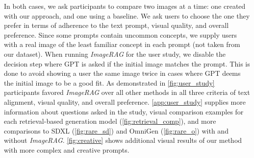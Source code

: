 In both cases, we ask participants to compare two images at a time: one created with our approach, and one using a baseline. We ask users to choose the one they prefer in terms of adherence to the text prompt,
visual quality, and overall preference. Since some prompts contain uncommon concepts, we supply users with a real image of the least familiar concept in each prompt (not taken from our dataset).
When running \emph{ImageRAG} for the user study, we disable the decision step where GPT is asked if the initial image matches the prompt. This is done to avoid showing a user the same image twice in cases where GPT deems the initial image to be a good fit.
As demonstrated in \cref{fig:user_study} participants favored \emph{ImageRAG} over all other methods in all three criteria of text alignment, visual quality, and overall preference.
\cref{app:user_study} supplies more information about questions asked in the study, visual comparison examples for each retrieval-based generation model (\cref{fig:retrieval_comp}), and more comparisons to SDXL (\cref{fig:rare_sd}) and OmniGen (\cref{fig:rare_o}) with and without \emph{ImageRAG}. 
\cref{fig:creative} shows additional visual results of our method with more complex and creative prompts.
